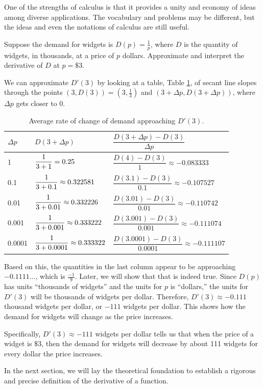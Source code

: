 One of the strengths of calculus is that it provides a unity and economy of ideas among diverse applications. The vocabulary and problems may be different, but the ideas and even the notations of calculus are still useful.

\begin{example}
Suppose the demand for widgets is $D(p)=\frac{1}{p}$, where $D$ is the quantity of widgets, in thousands, at a price of $p$ dollars. Approximate and interpret the derivative of $D$ at $p=\$3$.

\begin{solution} We can approximate $D'(3)$ by looking at a table, Table \ref{tab:2-3-Dprime}, of secant line slopes through the points $(3, D(3)) = \left(3, \frac{1}{3}\right)$ and $(3+\Delta p, D(3+\Delta p))$, where $\Delta p$ gets closer to $0$.

\begin{table}[ht!]
\begin{centering}
\begin{tabular}{lll}
\toprule
$\Delta p$ & $D(3+\Delta p)$ & $\dfrac{D(3+\Delta p)-D(3)}{\Delta p}$ \\
\midrule
1        & $\dfrac{1\mathstrut}{3+1\mathstrut} = 0.25$                & $\dfrac{D(4)     -D(3)}{1}     \approx -0.083333$ \\
0.1      & $\dfrac{1\mathstrut}{3+0.1\mathstrut} \approx 0.322581$    & $\dfrac{D(3.1)   -D(3)}{0.1}   \approx -0.107527$ \\
0.01     & $\dfrac{1\mathstrut}{3+0.01\mathstrut} \approx 0.332226$   & $\dfrac{D(3.01)  -D(3)}{0.01}  \approx -0.110742$ \\
0.001    & $\dfrac{1\mathstrut}{3+0.001\mathstrut} \approx 0.333222$  & $\dfrac{D(3.001) -D(3)}{0.001} \approx -0.111074$ \\
0.0001   & $\dfrac{1\mathstrut}{3+0.0001\mathstrut} \approx 0.333322$ & $\dfrac{D(3.0001)-D(3)}{0.0001}\approx -0.111107$ \\
\bottomrule
\end{tabular}
\caption{Average rate of change of demand approaching $D'(3)$.}
\label{tab:2-3-Dprime}
\end{centering}
\end{table}
Based on this, the quantities in the last column appear to be approaching $-0.1111\ldots$, which is $\frac{-1}{9}$. Later, we will show that that is indeed true. Since $D(p)$ has units ``thousands of widgets'' and the units for $p$ is ``dollars,'' the units for $D'(3)$ will be thousands of widgets per dollar. Therefore, $D'(3) \approx -0.111$ thousand widgets per dollar, or $-111$ widgets per dollar. This shows how the demand for widgets will change as the price increases.

Specifically, $D'(3)\approx -111$ widgets per dollar tells us that when the price of a widget is $\$3$, then the demand for widgets will decrease by about 111 widgets for every dollar the price increases.
\end{solution}\end{example} 

In the next section, we will lay the theoretical foundation to establish a rigorous and precise definition of the derivative of a function.


